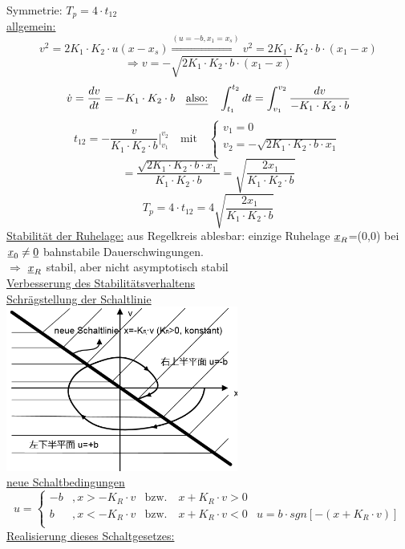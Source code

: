 \documentclass[openany,a4paper,11pt]{book}
\begin{document}
Symmetrie: $T_p=4\cdot t_{12}$\\
\uline{allgemein:} \[v^2=2K_1\cdot K_2\cdot u(x-x_s) \stackrel{(u=-b, x_1=x_s)}{\Rightarrow} v^2=2K_1 \cdot K_2 \cdot b \cdot (x_1-x)\]
\[\Rightarrow v=-\sqrt{2K_1 \cdot K_2 \cdot b \cdot (x_1-x)}\]
\[\dot{v}=\frac{dv}{dt}=- K_1 \cdot K_2 \cdot b \quad \text{\uline{also:}} \quad \int_{t_1}^{t_2}dt=\int_{v_1}^{v_2}\frac{dv}{- K_1 \cdot K_2 \cdot b}\]
\[t_{12}=-\frac{v}{K_1 \cdot K_2 \cdot b} \bigg|_{v_1}^{v_2} \quad \text{mit} \quad 
\left \{%
\begin{array}{lcrcl}
     v_1=0\\
     v_2=-\sqrt{2K_1 \cdot K_2 \cdot b\cdot x_1}\\
\end{array} \right. \]
\[=\frac{\sqrt{2K_1 \cdot K_2 \cdot b\cdot x_1}}{K_1 \cdot K_2 \cdot b}=\sqrt{\frac{2x_1}{K_1 \cdot K_2 \cdot b}}\]
\[T_p=4\cdot t_{12}=4\sqrt{\frac{2x_1}{K_1 \cdot K_2 \cdot b}}\]
\uline{Stabilität der Ruhelage:} aus Regelkreis ablesbar: einzige Ruhelage $\uline{x}_R$=(0,0) bei $\uline{x}_0\ne\uline{0}$ bahnstabile Dauerschwingungen.\\
$\Rightarrow$ $\uline{x}_R$ stabil, aber nicht asymptotisch stabil\\
\uline{Verbesserung des Stabilitätsverhaltens}\\
\uline{Schrägstellung der Schaltlinie}\\
\includegraphics[width=3in]{imgs/NLR14.png}\\
\uline{neue Schaltbedingungen}
\[u = \left \{%
\begin{array}{lcrcl}
     -b & ,x>-K_R\cdot v & \text{bzw.}\quad x+K_R\cdot v>0 &\\
     b & ,x<-K_R\cdot v & \text{bzw.}\quad x+K_R\cdot v<0 &u=b\cdot sgn[-(x+K_R\cdot v)] \\
\end{array} \right.
\]
\uline{Realisierung dieses Schaltgesetzes:}
\end{document}
